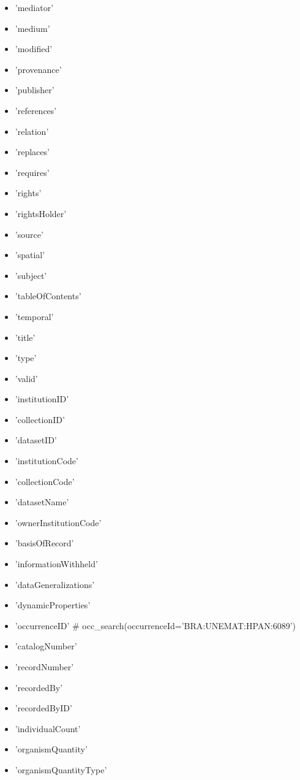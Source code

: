 \documentclass[a4paper]{book}
\begin{document}
\begin{Details}
\begin{itemize}
\item{} 'mediator'
\item{} 'medium'
\item{} 'modified'
\item{} 'provenance'
\item{} 'publisher'
\item{} 'references'
\item{} 'relation'
\item{} 'replaces'
\item{} 'requires'
\item{} 'rights'
\item{} 'rightsHolder'
\item{} 'source'
\item{} 'spatial'
\item{} 'subject'
\item{} 'tableOfContents'
\item{} 'temporal'
\item{} 'title'
\item{} 'type'
\item{} 'valid'
\item{} 'institutionID'
\item{} 'collectionID'
\item{} 'datasetID'
\item{} 'institutionCode' 
\item{} 'collectionCode' 
\item{} 'datasetName' 
\item{} 'ownerInstitutionCode'
\item{} 'basisOfRecord' 
\item{} 'informationWithheld' 
\item{} 'dataGeneralizations' 
\item{} 'dynamicProperties'
\item{} 'occurrenceID'  \# occ\_search(occurrenceId='BRA:UNEMAT:HPAN:6089')
\item{} 'catalogNumber' 
\item{} 'recordNumber' 
\item{} 'recordedBy' 
\item{} 'recordedByID'
\item{} 'individualCount'
\item{} 'organismQuantity'
\item{} 'organismQuantityType'

\end{itemize}
\end{Details}
\end{document}
